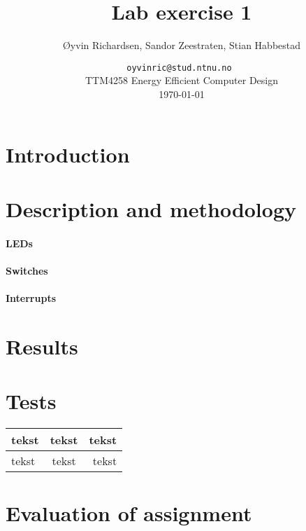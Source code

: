 \documentclass[a4paper,11pt]{article}
\title{Lab exercise 1}
\author{\O yvin Richardsen, Sandor Zeestraten, Stian Habbestad}
\date{ {\tt oyvinric@stud.ntnu.no }\\
TTM4258 Energy Efficient Computer Design \\
\today}
\begin{document}
\maketitle
\newpage

\begin{abstract}

\end{abstract}

\tableofcontents



\section{Introduction}


\section{Description and methodology}
\paragraph{LEDs}

\paragraph{Switches}

\paragraph{Interrupts}

\section{Results}

\section{Tests}
\begin{tabular}[pos]{l | c | r}
\hline
tekst & tekst & tekst \\ \hline
tekst & tekst & tekst \\ \hline
\end{tabular}


\section{Evaluation of assignment}
\end{document}
